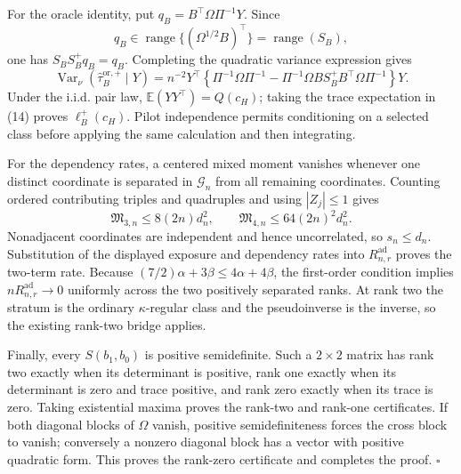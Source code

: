 For the oracle identity, put \(q_B=B^{\top}\Omega\Pi^{-1}Y\).  Since
\[
q_B\in\operatorname{range}\{(\Omega^{1/2}B)^{\top}\}
=\operatorname{range}(S_B),
\]
one has \(S_BS_B^+q_B=q_B\).  Completing the quadratic variance expression gives
\[
\operatorname{Var}_\nu(\widehat\tau_B^{\mathrm{or},+}\mid Y)
=n^{-2}Y^{\top}\left\{\Pi^{-1}\Omega\Pi^{-1}
-\Pi^{-1}\Omega B S_B^+B^{\top}\Omega\Pi^{-1}\right\}Y.
\tag{14}
\]
Under the i.i.d. pair law, \(\mathbb E(YY^{\top})=Q(c_H)\); taking the trace expectation in (14) proves \(\ell_B^+(c_H)\).  Pilot independence permits conditioning on a selected class before applying the same calculation and then integrating.

For the dependency rates, a centered mixed moment vanishes whenever one distinct coordinate is separated in \(\mathcal G_n\) from all remaining coordinates.  Counting ordered contributing triples and quadruples and using \(|Z_j|\le1\) gives
\[
\mathfrak M_{3,n}\le8(2n)d_n^2,
\qquad
\mathfrak M_{4,n}\le64(2n)^2d_n^2.
\tag{15}
\]
Nonadjacent coordinates are independent and hence uncorrelated, so \(s_n\le d_n\).  Substitution of the displayed exposure and dependency rates into \(R_{n,r}^{\mathrm{ad}}\) proves the two-term rate.  Because \((7/2)\alpha+3\beta\le4\alpha+4\beta\), the first-order condition implies \(nR_{n,r}^{\mathrm{ad}}\to0\) uniformly across the two positively separated ranks.  At rank two the stratum is the ordinary \(\kappa\)-regular class and the pseudoinverse is the inverse, so the existing rank-two bridge applies.

Finally, every \(S(b_1,b_0)\) is positive semidefinite.  Such a \(2\times2\) matrix has rank two exactly when its determinant is positive, rank one exactly when its determinant is zero and trace positive, and rank zero exactly when its trace is zero.  Taking existential maxima proves the rank-two and rank-one certificates.  If both diagonal blocks of \(\Omega\) vanish, positive semidefiniteness forces the cross block to vanish; conversely a nonzero diagonal block has a vector with positive quadratic form.  This proves the rank-zero certificate and completes the proof. \(\square\)